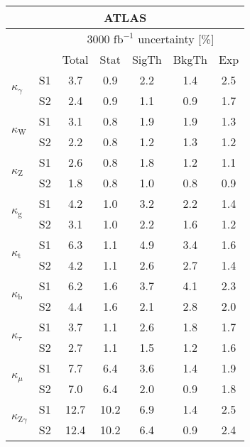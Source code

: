\begin{tabular}{@{} l c c@{\hskip 0.15in} c c c c @{}}
  \hline
     \multicolumn{7}{c}{ATLAS}\\
 \hline
  &  & \multicolumn{5}{c}{3000 $\text{fb}^{-1}$ uncertainty [\%]} \\
  &  & Total & Stat & SigTh & BkgTh & Exp \\
  \hline
  \multirow{2}{*}{$\kappa_{\gamma }$} & S1 & 3.7   & 0.9   & 2.2   & 1.4   & 2.5  \\[1pt]
  & S2& 2.4   & 0.9   & 1.1   & 0.9   & 1.7  \\[4pt]
  \multirow{2}{*}{$\kappa_{\mathrm{W}}$} & S1  & 3.1   & 0.8   & 1.9   & 1.9   & 1.3  \\[1pt]
  & S2 & 2.2   & 0.8   & 1.2   & 1.3   & 1.2  \\[4pt]
  \multirow{2}{*}{$\kappa_{\mathrm{Z}}$} & S1 & 2.6   & 0.8   & 1.8   & 1.2   & 1.1  \\[1pt]
  & S2 & 1.8   & 0.8   & 1.0   & 0.8   & 0.9  \\[4pt]
  \multirow{2}{*}{$\kappa_{\mathrm{g}}$} & S1 & 4.2   & 1.0   & 3.2   & 2.2   & 1.4  \\[1pt]
  & S2 & 3.1   & 1.0   & 2.2   & 1.6   & 1.2  \\[4pt]
  \multirow{2}{*}{$\kappa_{\mathrm{t}}$} & S1 & 6.3   & 1.1   & 4.9   & 3.4   & 1.6  \\[1pt]
  & S2 & 4.2   & 1.1   & 2.6   & 2.7   & 1.4  \\[4pt]
  \multirow{2}{*}{$\kappa_{\mathrm{b}}$} & S1 & 6.2   & 1.6   & 3.7   & 4.1   & 2.3  \\[1pt]
  & S2  & 4.4   & 1.6   & 2.1   & 2.8   & 2.0  \\[4pt]
  \multirow{2}{*}{$\kappa_{\tau }$} & S1 & 3.7 & 1.1   & 2.6   & 1.8   & 1.7  \\[1pt]
  & S2 & 2.7   & 1.1   & 1.5   & 1.2   & 1.6  \\[4pt]
  \multirow{2}{*}{$\kappa_{\mu}$} & S1  & 7.7 & 6.4   & 3.6   & 1.4   & 1.9  \\[1pt]
  & S2 & 7.0   & 6.4   & 2.0   & 0.9   & 1.8  \\[4pt]
  \multirow{2}{*}{$\kappa_{\mathrm{Z}\gamma}$} & S1 & 12.7  & 10.2  & 6.9   & 1.4   & 2.5  \\[1pt]
  & S2 & 12.4  & 10.2  & 6.4   & 0.9   & 2.4  \\[4pt]
  \hline
\end{tabular}
